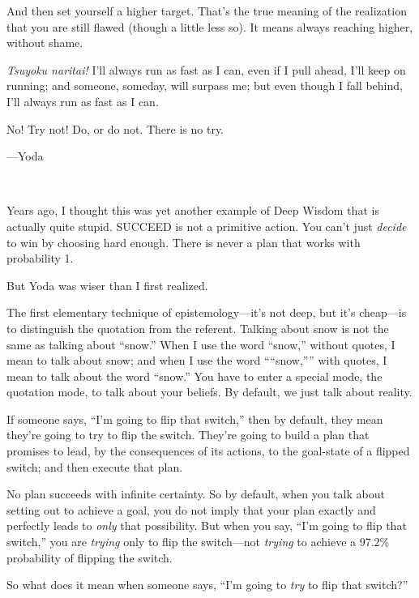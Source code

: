 {
 And then set yourself a higher target. That's the
true meaning of the realization that you are still flawed (though a
little less so). It means always reaching higher, without shame.}

{
 \textit{Tsuyoku naritai!} I'll always run as fast
as I can, even if I pull ahead, I'll keep on running;
and someone, someday, will surpass me; but even though I fall behind,
I'll always run as fast as I can.}

\myendsectiontext


{
 No! Try not! Do, or do not. There is no try.}

{\raggedleft
 {}---Yoda
\par}


\bigskip

{
 ~}

{
 Years ago, I thought this was yet another example of Deep Wisdom
that is actually quite stupid. SUCCEED is not a primitive action. You
can't just \textit{decide} to win by choosing hard
enough. There is never a plan that works with probability 1.}

{
 But Yoda was wiser than I first realized.}

{
 The first elementary technique of
epistemology---it's not deep, but it's
cheap---is to distinguish the quotation from the referent. Talking
about snow is not the same as talking about
``snow.'' When I use the word
``snow,'' without quotes, I mean to
talk about snow; and when I use the word
````snow,''''
with quotes, I mean to talk about the word
``snow.'' You have to enter a
special mode, the quotation mode, to talk about your beliefs. By
default, we just talk about reality.}

{
 If someone says, ``I'm going to
flip that switch,'' then by default, they mean
they're going to try to flip the switch.
They're going to build a plan that promises to lead, by
the consequences of its actions, to the goal-state of a flipped switch;
and then execute that plan.}

{
 No plan succeeds with infinite certainty. So by default, when you
talk about setting out to achieve a goal, you do not imply that your
plan exactly and perfectly leads to \textit{only} that possibility. But
when you say, ``I'm going to flip that
switch,'' you are \textit{trying} only to flip the
switch---not \textit{trying} to achieve a 97.2\% probability of
flipping the switch.}

{
 So what does it mean when someone says,
``I'm going to \textit{try} to flip
that switch?''}

